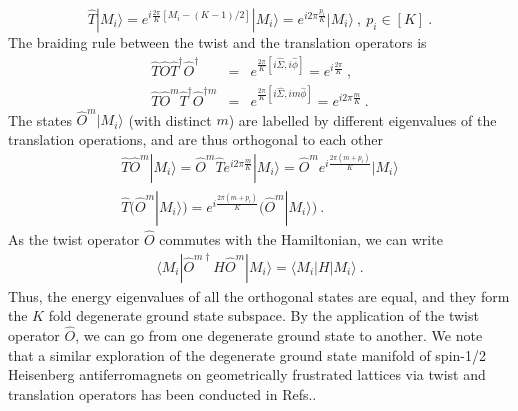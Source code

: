 \documentclass[reprint,prb,superscriptaddress]{revtex4-2}
\begin{document}
\begin{equation}
\hat{T}|M_i\rangle = e^{i\frac{2\pi}{K} [M_i-(K-1)/2]} |M_i\rangle = e^{i2\pi\frac{p_i}{K} } |M_i\rangle~,~p_i\in[K]~.
\end{equation}
The braiding rule between the twist and the translation operators is
\begin{eqnarray}
\hat{T}\hat{O}\hat{T}^{\dagger}\hat{O}^{\dagger} &=& e^{\frac{2\pi }{K}[i\hat{\Sigma},i\hat{\phi}]}=e^{i\frac{2\pi }{K}} ~,\nonumber\\
\hat{T}\hat{O}^m\hat{T}^{\dagger}\hat{O}^{\dagger m} &=& e^{\frac{2\pi }{K}[i\hat{\Sigma},im\hat{\phi}]}=e^{i2\pi \frac{m}{K}}~.
\end{eqnarray}
The states $\hat{O}^m |M_i\rangle$ (with distinct $m$) are labelled by different eigenvalues of the translation operations, and are thus orthogonal to each other
\begin{gather}
\hat{T} \hat{O}^m |M_i\rangle = \hat{O}^m \hat{T} e^{i2\pi \frac{m}{K}} |M_i\rangle =\hat{O}^m e^{i \frac{2\pi(m+p_i)}{K} } |M_i\rangle \\
\hat{T} \bigg(\hat{O}^m |M_i\rangle \bigg) = e^{i \frac{2\pi(m+p_i)}{K} } \bigg( \hat{O}^m |M_i\rangle \bigg)~.
\end{gather}
As the twist operator $\hat{O}$ commutes with the Hamiltonian, we can write
\begin{eqnarray}
\langle M_i| \hat{O}^{m \dagger}  H \hat{O}^m |M_i\rangle =\langle M_i|  H |M_i\rangle ~.
\end{eqnarray}
Thus, the energy eigenvalues of all the orthogonal states are equal, and they form the $K$ fold degenerate ground state subspace. By the application of the twist operator $\hat{O}$, we can go from one degenerate ground state to another. We note that a similar exploration of the degenerate ground state manifold of spin-1/2 Heisenberg antiferromagnets on geometrically frustrated lattices via twist and translation operators has been conducted in Refs.\cite{pal2019magnetization,pal2020topological}. 
\end{document}
